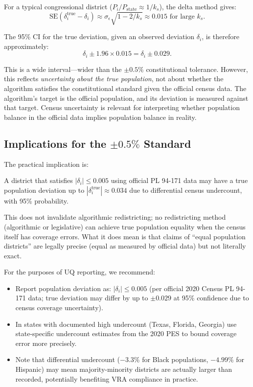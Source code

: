For a typical congressional district ($P_i / P_\text{state} \approx 1/k_s$),
the delta method gives:
\begin{equation}
  \text{SE}(\delta_i^{\text{true}} - \delta_i)
    \approx \sigma_\epsilon \sqrt{1 - 2/k_s}
    \approx 0.015 \text{ for large } k_s.
\end{equation}

The 95\% CI for the true deviation, given an observed deviation $\delta_i$,
is therefore approximately:
\begin{equation}
  \delta_i \pm 1.96 \times 0.015 = \delta_i \pm 0.029.
\end{equation}

This is a wide interval---wider than the $\pm 0.5\%$ constitutional
tolerance. However, this reflects \emph{uncertainty about the true
population}, not about whether the algorithm satisfies the constitutional
standard given the official census data. The algorithm's target is the
official population, and its deviation is measured against that target.
Census uncertainty is relevant for interpreting whether population
balance in the official data implies population balance in reality.

\subsection{Implications for the $\pm 0.5\%$ Standard}

The practical implication is:

\begin{proposition}
A district that satisfies $|\delta_i| \leq 0.005$ using official
PL 94-171 data may have a true population deviation up to
$|\delta_i^{\text{true}}| \approx 0.034$ due to differential
census undercount, with 95\% probability.
\end{proposition}

This does not invalidate algorithmic redistricting; no redistricting
method (algorithmic or legislative) can achieve true population equality
when the census itself has coverage errors. What it does mean is that
claims of ``equal population districts'' are legally precise (equal
as measured by official data) but not literally exact.

For the purposes of UQ reporting, we recommend:
\begin{itemize}
  \item Report population deviation as: $|\delta_i| \leq 0.005$
    (per official 2020 Census PL 94-171 data; true deviation may
    differ by up to $\pm 0.029$ at 95\% confidence due to census
    coverage uncertainty).

  \item In states with documented high undercount (Texas, Florida,
    Georgia) use state-specific undercount estimates from the 2020 PES
    to bound coverage error more precisely.

  \item Note that differential undercount ($-3.3\%$ for Black populations,
    $-4.99\%$ for Hispanic) may mean majority-minority districts are
    actually larger than recorded, potentially benefiting VRA compliance
    in practice.
\end{itemize}

